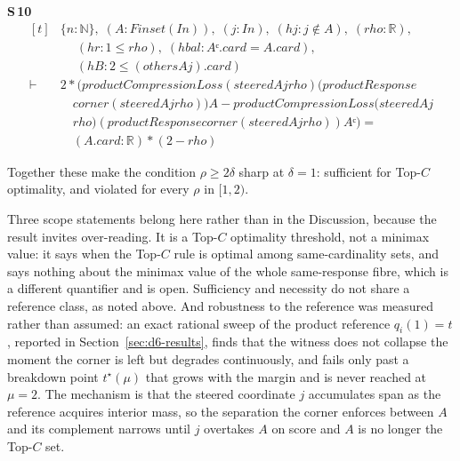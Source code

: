 \noindent\textbf{S\,10}\quad{}
{\footnotesize\[ \begin{aligned}[t]
&\{ \mathit{n} : \mathbb{N} \},\; (\mathit{A} : \mathit{Finset} (\mathit{I} \mathit{n})),\; (\mathit{j} : \mathit{I} \mathit{n}),\; (\mathit{hj} : \mathit{j} \notin \mathit{A}),\; (\mathit{rho} : \mathbb{R} ),\\
&\quad \; (\mathit{hr} : 1 \leq \mathit{rho}),\; (\mathit{hbal} : \mathit{Aᶜ}.\mathit{card}=\mathit{A}.\mathit{card}),\\
&\quad \; (\mathit{hB} : 2 \leq (\mathit{others} \mathit{A} \mathit{j}).\mathit{card})\\
\vdash\;&2*(\mathit{productCompressionLoss} (\mathit{steered} \mathit{A} \mathit{j} \mathit{rho}) (\mathit{productResponse}\\
&\quad \mathit{corner} (\mathit{steered} \mathit{A} \mathit{j} \mathit{rho})) \mathit{A}- \mathit{productCompressionLoss} (\mathit{steered} \mathit{A} \mathit{j}\\
&\quad \mathit{rho}) (\mathit{productResponse} \mathit{corner} (\mathit{steered} \mathit{A} \mathit{j} \mathit{rho})) \mathit{Aᶜ})=\\
&\quad (\mathit{A}.\mathit{card}:\mathbb{R} )*(2-\mathit{rho})
\end{aligned} \]}


Together these make the condition $\rho\ge2\delta$ sharp at $\delta=1$: sufficient for
Top-$C$ optimality, and violated for every $\rho$ in $[1,2)$.

Three scope statements belong here rather than in the Discussion, because the result invites
over-reading. It is a Top-$C$ optimality threshold, not a minimax value: it says when the
Top-$C$ rule is optimal among same-cardinality sets, and says nothing about the minimax value
of the whole same-response fibre, which is a different quantifier and is open. Sufficiency and
necessity do not share a reference class, as noted above. And robustness to the reference
was measured rather than assumed: an exact rational sweep of the product reference
$q_{i}(1)=t$, reported in Section~\ref{sec:d6-results}, finds that the witness does not collapse
the moment the corner is left but degrades continuously, and fails only past a breakdown point
$t^{\star}(\mu)$ that grows with the margin and is never reached at $\mu=2$. The mechanism is
that the steered coordinate $j$ accumulates span as the reference acquires interior mass, so
the separation the corner enforces between $A$ and its complement narrows until $j$ overtakes
$A$ on score and $A$ is no longer the Top-$C$ set.

